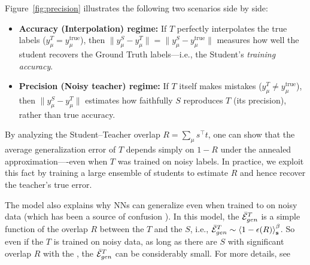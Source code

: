 

Figure~\ref{fig:precision} illustrates the following two scenarios side by side:
\begin{itemize}
  \item \textbf{Accuracy (Interpolation) regime:}
    If $T$ perfectly interpolates the true labels ($y^T_\mu = y^\text{true}_\mu$), then
    \( \|y^S_\mu - y^T_\mu\| = \|y^S_\mu - y^\text{true}_\mu\| \)
    measures how well the student recovers the Ground Truth labels—i.e., the Student's \emph{training accuracy}.

  \item \textbf{Precision (Noisy teacher) regime:}
    If $T$ itself makes mistakes ($y^T_\mu \neq y^\text{true}_\mu$), then
    \( \|y^S_\mu - y^T_\mu\| \)
    estimates how faithfully $S$ reproduces $T$ (its precision), rather than true accuracy.
\end{itemize}

By analyzing the Student–Teacher overlap $R = \sum_\mu s^{\top} t$, one can show that the average generalization error of $T$ depends simply on $1-R$ under the annealed approximation—-even when $T$ was trained on noisy labels. In practice, we exploit this fact by training a large ensemble of students to estimate $R$ and hence recover the teacher’s true error.
%

%
The \StudentTeacher model also explains why NNs can generalize even when trained to \Interpolation on noisy data (which has been a source of confusion \cite{Understanding16_TR}). In this model, the \GeneralizationError $\bar{\mathcal{E}}_{gen}^{T}$ is a simple function of the overlap $R$ between the \Teacher $T$ and the \Students $S$, i.e., $\bar{\mathcal{E}}_{gen}^{T}\sim \left\langle 1-\epsilon(R) \right\rangle_{\mathbf s}^{\beta}$. So even if the \Teacher $T$ is trained on noisy data, as long as there are \Students $S$ with significant overlap $R$ with the \Teacher, the \Teacher \GeneralizationError $\bar{\mathcal{E}}_{gen}^{T}$ can be considerably small. For more details, see \cite{MM17_TR_v1}


